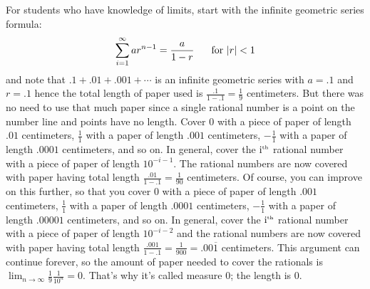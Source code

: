 \documentclass[12pt]{article}
\begin{document}
For students who have knowledge of limits, start with the 
infinite geometric series formula:
\[\sum_{i=1}^{\infty}ar^{n-1}=\frac{a}{1-r} \hspace{4ex}\mbox{for }|r|<1\]
and note that $.1+.01+.001+\cdots$ is an infinite geometric
series with $a=.1$ and $r=.1$ hence the total length of paper used 
is $\frac{.1}{1-.1}=\frac{1}{9}$ centimeters. But there
was no need to use that much paper since a single rational 
number is a point on the number line and points have no 
length. Cover $0$ with a piece of paper of length $.01$ centimeters, 
$\frac{1}{1}$ with a paper of length $.001$ centimeters, 
$-\frac{1}{1}$ with a paper of length $.0001$ centimeters, and
so on. In general, cover the $\mbox{i}^{\tiny\mbox{th}}$
rational number with a piece of paper of length $10^{-i-1}$. The
rational numbers are now covered with paper having total length
$\frac{.01}{1-.1}=\frac{1}{90}$ centimeters. Of course, you can 
improve on this further, so that you cover $0$ with a piece of paper 
of length $.001$ centimeters, $\frac{1}{1}$ with a paper of length 
$.0001$ centimeters, $-\frac{1}{1}$ with a paper of length 
$.00001$ centimeters, and so on. In general, cover the 
$\mbox{i}^{\tiny\mbox{th}}$ rational number with a piece of 
paper of length $10^{-i-2}$ and the rational numbers are now 
covered with paper having total length
$\frac{.001}{1-.1}=\frac{1}{900}=.00\overline{1}$ centimeters.
This argument can continue forever, so the amount of paper 
needed to cover the rationals is 
$\lim_{n\to \infty}\frac{1}{9}\frac{1}{10^n}=0$. That's why 
it's called measure $0$; the length is $0$.
\end{document}
